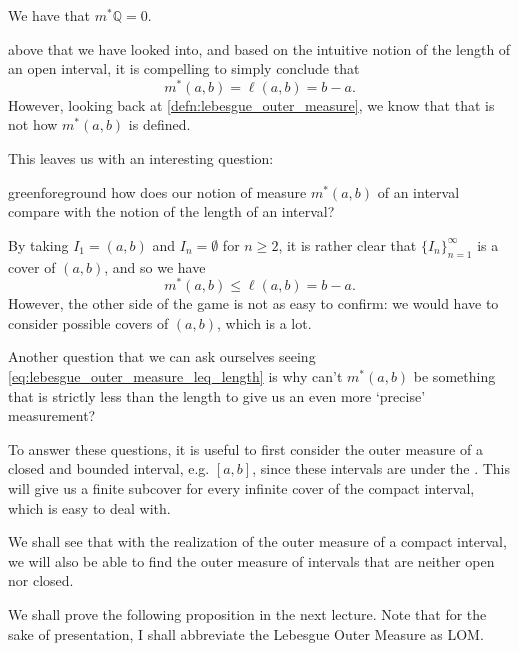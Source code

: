 \documentclass[notoc,notitlepage]{tufte-book}
\begin{document}
\begin{crly}\label{crly:lebesgue_outer_measure_of_q_is_zero}
  We have that $m^* \mathbb{Q} = 0$.
\end{crly}

 above that we have looked into, and based on the
intuitive notion of the length of an open interval, it is compelling to simply
conclude that
\begin{equation*}
  m^* (a, b) = \ell(a, b) = b - a.
\end{equation*}
However, looking back at \cref{defn:lebesgue_outer_measure}, we know that that
is not how $m^* (a, b)$ is defined.

This leaves us with an interesting question:
\begin{quotebox}{green}{foreground}
  how does our notion of measure $m^*(a, b)$ of an interval compare with the
  notion of the length of an interval?
\end{quotebox}

By taking $I_1 = (a, b)$ and $I_n = \emptyset$ for $n \geq 2$, it is rather
clear that $\{ I_n \}_{n=1}^{\infty}$ is a cover of $(a, b)$, and so we have
\begin{equation}\label{eq:lebesgue_outer_measure_leq_length}
  m^* (a, b) \leq \ell(a, b) = b - a.
\end{equation}
However, the other side of the game is not as easy to confirm: we would have to
consider  possible covers of $(a, b)$, which is a lot.

Another question that we can ask ourselves seeing
\cref{eq:lebesgue_outer_measure_leq_length} is why can't $m^*(a, b)$ be
something that is strictly less than the length to give us an even more
`precise' measurement?

To answer these questions, it is useful to first consider the outer measure of a
closed and bounded interval, e.g. $[a, b]$, since these intervals are
 under the . This will give us a
finite subcover for every infinite cover of the compact interval, which is easy
to deal with.

We shall see that with the realization of the outer measure of a compact
interval, we will also be able to find the outer measure of intervals that are
neither open nor closed.

We shall prove the following proposition in the next lecture. Note that for the
sake of presentation, I shall abbreviate the Lebesgue Outer Measure as LOM.
\end{document}
